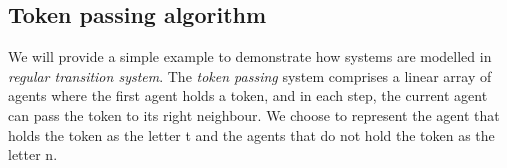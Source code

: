 \subsection*{Token passing algorithm}\label{example:token-passing}
We will provide a simple example to demonstrate how systems are 
modelled in \textit{regular transition system}.
The \textit{token passing} system comprises a linear array of agents where the first 
agent holds a token, and in each step, the current agent can pass 
the token to its right neighbour. We choose to represent the agent that holds 
the token as the letter t and the agents that do not hold the token
as the letter n.
